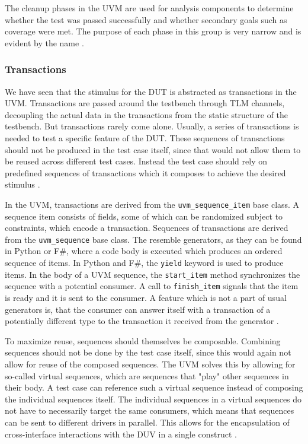 \documentclass[11pt]{report}
\newcommand{\ttt}{\texttt}
\begin{document}
The cleanup phases in the UVM are used for analysis components to determine whether the test was passed successfully
and whether secondary goals such as coverage were met. The purpose of each phase in this group is very narrow and is
evident by the name \cite[ch. 4.6]{mehta2018asic}.

\subsubsection{Transactions} %

We have seen that the stimulus for the DUT is abstracted as transactions in the UVM. Transactions are passed around
the testbench through TLM channels, decoupling the actual data in the transactions from the static structure of the
testbench. But transactions rarely come alone. Usually, a series of transactions is needed to test a specific feature
of the DUT. These sequences of transactions should not be produced in the test case itself, since that would not
allow them to be reused across different test cases. Instead the test case should rely on predefined sequences of
transactions which it composes to achieve the desired stimulus \cite[Ch. 23]{salemi2013uvm}.

In the UVM, transactions are derived from the \texttt{uvm\_sequence\_item} base class. A sequence item consists of
fields, some of which can be randomized subject to constraints, which encode a transaction. Sequences of transactions
are derived from the \ttt{uvm\_sequence} base class. The resemble generators, as they can be found in Python or F\#,
where a code body is executed which produces an ordered sequence of items. In Python and F\#, the \ttt{yield} keyword
is used to produce items. In the body of a UVM sequence, the \ttt{start\_item} method synchronizes the sequence with
a potential consumer. A call to \ttt{finish\_item} signals that the item is ready and it is sent to the consumer. A
feature which is not a part of usual generators is, that the consumer can answer itself with a transaction of a
potentially different type to the transaction it received from the generator \cite[Ch. 4.3]{mehta2018asic}.

To maximize reuse, sequences should themselves be composable. Combining sequences should not be done by the test case
itself, since this would again not allow for reuse of the composed sequences. The UVM solves this by allowing for
so-called virtual sequences, which are sequences that "play" other sequences in their body. A test case can reference
such a virtual sequence instead of composing the individual sequences itself. The individual sequences in a virtual
sequences do not have to necessarily target the same consumers, which means that sequences can be sent to different
drivers in parallel. This allows for the encapsulation of cross-interface interactions with the DUV in a single
construct \cite[Ch. 23]{salemi2013uvm}.
\end{document}
